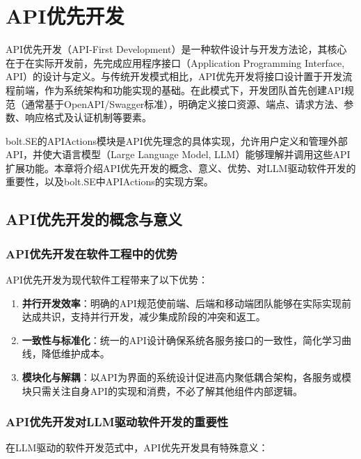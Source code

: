 
\chapter{API优先开发}
\label{chap:api-first}

API优先开发（API-First Development）是一种软件设计与开发方法论，其核心在于在实际开发前，先完成应用程序接口（Application Programming Interface, API）的设计与定义。与传统开发模式相比，API优先开发将接口设计置于开发流程前端，作为系统架构和功能实现的基础。在此模式下，开发团队首先创建API规范（通常基于OpenAPI/Swagger标准），明确定义接口资源、端点、请求方法、参数、响应格式及认证机制等要素。

bolt.SE的APIActions模块是API优先理念的具体实现，允许用户定义和管理外部API，并使大语言模型（Large Language Model, LLM）能够理解并调用这些API扩展功能。本章将介绍API优先开发的概念、意义、优势、对LLM驱动软件开发的重要性，以及bolt.SE中APIActions的实现方案。

\section{API优先开发的概念与意义}

\subsection{API优先开发在软件工程中的优势}
API优先开发为现代软件工程带来了以下优势：

\begin{enumerate}
  \item \textbf{并行开发效率}：明确的API规范使前端、后端和移动端团队能够在实际实现前达成共识，支持并行开发，减少集成阶段的冲突和返工。
  
  \item \textbf{一致性与标准化}：统一的API设计确保系统各服务接口的一致性，简化学习曲线，降低维护成本。
  
  \item \textbf{模块化与解耦}：以API为界面的系统设计促进高内聚低耦合架构，各服务或模块只需关注自身API的实现和消费，不必了解其他组件内部逻辑。
  
\end{enumerate}

\subsection{API优先开发对LLM驱动软件开发的重要性}
在LLM驱动的软件开发范式中，API优先开发具有特殊意义：

